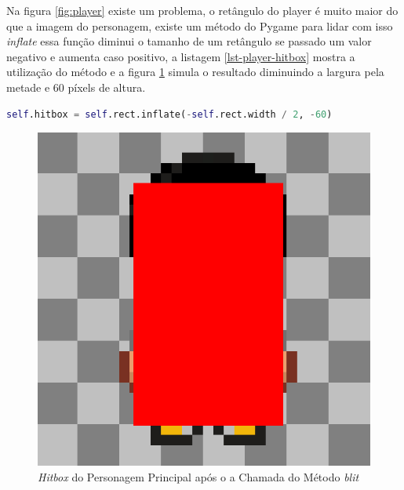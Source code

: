 

\clearpage
Na figura \ref{fig:player} existe um problema, o retângulo do player é muito maior do que a imagem do personagem, existe um método do Pygame para lidar com isso  \textit{inflate} essa função diminui o tamanho de um retângulo se passado um valor negativo e aumenta caso positivo, a listagem \ref{lst-player-hitbox} mostra a utilização do método e a figura \ref{fig:player-hitbox} simula o resultado diminuindo a largura pela metade e 60 píxels de altura.

\begin{lstlisting}[language=Python,breaklines, caption= Uso da Função \textit{inflate}, label= lst-player-hitbox]
self.hitbox = self.rect.inflate(-self.rect.width / 2, -60)
\end{lstlisting}
\begin{figure}[h!]
    \centering
    \includegraphics[width=0.5\linewidth]{figuras/player-hitbox.png}
    \caption{\textit{Hitbox} do Personagem Principal após o a Chamada do Método \textit{blit}}
    \label{fig:player-hitbox}
\end{figure}






